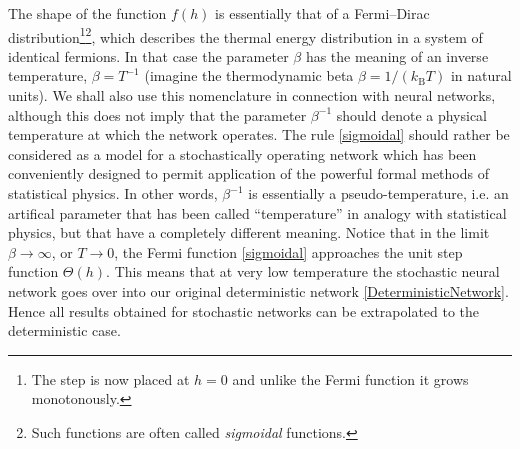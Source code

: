 The shape of the function $f(h)$ is essentially that of a Fermi--Dirac distribution\footnote{The step is now placed at $h=0$ and unlike the Fermi function it grows monotonously.}\footnote{Such functions are often called \emph{sigmoidal} functions.}, which describes the thermal energy distribution in a system of identical fermions. In that case the parameter $\beta$ has the meaning of an inverse temperature, $\beta=T^{-1}$ (imagine the thermodynamic beta $\beta=1/(k_{\text{B}}T)$ in natural units). We shall also use this nomenclature in connection with neural networks, although this does not imply that the parameter $\beta^{-1}$ should denote a physical temperature at which the network operates. The rule \eqref{sigmoidal} should rather be considered as a model for a stochastically operating network which has been conveniently designed to permit application of the powerful formal methods of statistical physics. In other words, $\beta^{-1}$ is essentially a pseudo-temperature, i.e. an artifical parameter that has been called ``temperature'' in analogy with statistical physics, but that have a completely different meaning. Notice that in the limit $\beta\rightarrow\infty$, or $T\rightarrow0$, the Fermi function \eqref{sigmoidal} approaches the unit step function $\Theta(h)$. This means that at very low temperature the stochastic neural network goes over into our original deterministic network \eqref{DeterministicNetwork}. Hence all results obtained for stochastic networks can be extrapolated to the deterministic case.
\begin{figure}[ht]
\centering
{}
\caption{}\label{f(h)}
\end{figure}

